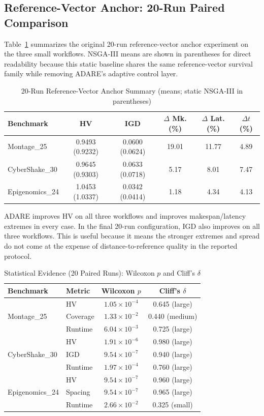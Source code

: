 \documentclass[preprint,12pt]{elsarticle}
\begin{document}
\subsection{Reference-Vector Anchor: 20-Run Paired Comparison}
Table~\ref{tab:main20} summarizes the original 20-run reference-vector anchor experiment on the three small workflows. NSGA-III means are shown in parentheses for direct readability because this static baseline shares the same reference-vector survival family while removing ADARE's adaptive control layer.

\begin{table}[t]
\caption{20-Run Reference-Vector Anchor Summary (means; static NSGA-III in parentheses)}
\label{tab:main20}
\centering
\small
\begin{tabular}{@{}lccccc@{}}
\toprule
Benchmark & HV & IGD & $\Delta$ Mk. (\%) & $\Delta$ Lat. (\%) & $\Delta t$ (\%) \\
\midrule
Montage\_25 & 0.9493 (0.9232) & 0.0600 (0.0624) & 19.01 & 11.77 & 4.89 \\
CyberShake\_30 & 0.9645 (0.9303) & 0.0633 (0.0718) & 5.17 & 8.01 & 7.47 \\
Epigenomics\_24 & 1.0453 (1.0337) & 0.0342 (0.0414) & 1.18 & 4.34 & 4.13 \\
\bottomrule
\end{tabular}
\end{table}

ADARE improves HV on all three workflows and improves makespan/latency extremes in every case. In the final 20-run configuration, IGD also improves on all three workflows. This is useful because it means the stronger extremes and spread do not come at the expense of distance-to-reference quality in the reported protocol.

\begin{table}[t]
\caption{Statistical Evidence (20 Paired Runs): Wilcoxon $p$ and Cliff's $\delta$}
\label{tab:stats20}
\centering
\scriptsize
\begin{tabular}{@{}l l c c@{}}
\toprule
Benchmark & Metric & Wilcoxon $p$ & Cliff's $\delta$ \\
\midrule
\multirow{3}{*}{Montage\_25}
& HV & $1.05\times10^{-4}$ & 0.645 (large) \\
& Coverage & $1.33\times10^{-2}$ & 0.440 (medium) \\
& Runtime & $6.04\times10^{-3}$ & 0.725 (large) \\
\midrule
\multirow{3}{*}{CyberShake\_30}
& HV & $1.91\times10^{-6}$ & 0.980 (large) \\
& IGD & $9.54\times10^{-7}$ & 0.940 (large) \\
& Runtime & $1.97\times10^{-4}$ & 0.760 (large) \\
\midrule
\multirow{3}{*}{Epigenomics\_24}
& HV & $9.54\times10^{-7}$ & 0.960 (large) \\
& Spacing & $9.54\times10^{-7}$ & 0.965 (large) \\
& Runtime & $2.66\times10^{-2}$ & 0.325 (small) \\
\bottomrule
\end{tabular}
\end{table}
\end{document}
